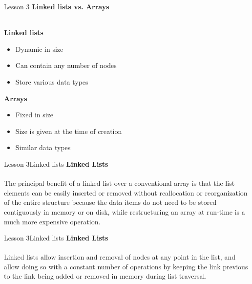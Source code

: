 \documentclass[aspectratio=1610]{beamer}
\begin{document}
\begin{frame}{Lesson 3}{}
{\LARGE\textbf{{Linked lists vs. Arrays}}}\\~\\
\noindent\begin{minipage}[t]{0.5\linewidth}
    \textbf{Linked lists}
    \begin{itemize}
    \item{Dynamic in size}
    \item{Can contain any number of nodes}
    \item{Store various data types}
    \end{itemize}
    \end{minipage}%
    \begin{minipage}[t]{0.5\linewidth}
    \textbf{Arrays}
    \begin{itemize}
    \item{Fixed in size}
    \item{Size is given at the time of creation}
    \item{Similar data types}
    \end{itemize}
\end{minipage}\par\bigskip
\end{frame}



\begin{frame}{Lesson 3}{Linked lists}
\LARGE
\textbf{Linked Lists}\\~\\
The principal benefit of a linked list over a conventional array is that the list
elements can be easily inserted or removed without reallocation or reorganization
of the entire structure because the data items do not need to be stored
contiguously in memory or on disk, while restructuring an array at run-time is a
much more expensive operation.
\end{frame}




\begin{frame}{Lesson 3}{Linked lists}
\LARGE
\textbf{Linked Lists}\\~\\
 Linked lists allow insertion and removal of nodes at any point in the list, and
 allow doing so with a constant number of operations by keeping the link previous
 to the link being added or removed in memory during list traversal. 
\end{frame}
\end{document}

